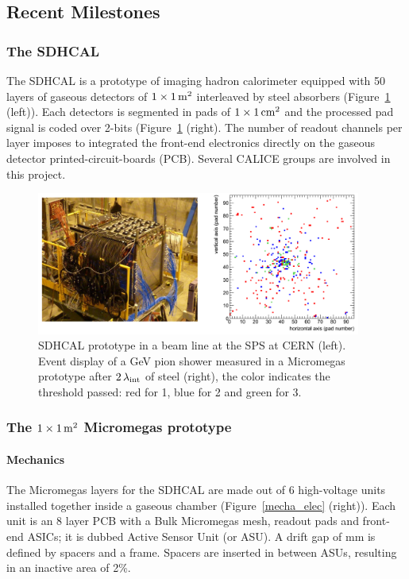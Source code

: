 \subsection{Recent Milestones}

\subsubsection{The SDHCAL}

The SDHCAL is a prototype of imaging hadron calorimeter equipped with 50 layers of gaseous detectors of $1\times \unit[1]{m^{2}}$ interleaved by steel absorbers (Figure~\ref{sdhcal} (left)). Each detectors is segmented in pads of $1\times\unit[1]{cm^{2}}$ and the processed pad signal is coded over 2-bits (Figure~\ref{sdhcal} (right). The number of readout channels per layer imposes to integrated the front-end electronics directly on the gaseous detector printed-circuit-boards (PCB). Several CALICE groups are involved in this project.

\begin{figure}
\begin{centering}
\includegraphics[width=0.95\textwidth]{Calorimeter/SDHCAL/test}
\caption{SDHCAL prototype in a beam line at the SPS at CERN (left). Event display of a \unit[150]{GeV} pion shower measured in a Micromegas prototype after $\unit[2]{\lambda_{int}}$ of steel (right), the color indicates the threshold passed: red for 1, blue for 2 and green for 3.}
\label{sdhcal}
\end{centering}
\end{figure}


\subsubsection{The $1\times\unit[1]{m^{2}}$ Micromegas prototype}

\paragraph{Mechanics}
The Micromegas layers for the SDHCAL are made out of 6 high-voltage units installed together inside a gaseous chamber (Figure~\ref{mecha_elec} (right)). Each unit is an 8 layer PCB with a Bulk Micromegas mesh, readout pads and front-end ASICs; it is dubbed Active Sensor Unit (or ASU). A drift gap of \unit[3]{mm} is defined by spacers and a frame. Spacers are inserted in between ASUs, resulting in an inactive area of 2\%.


